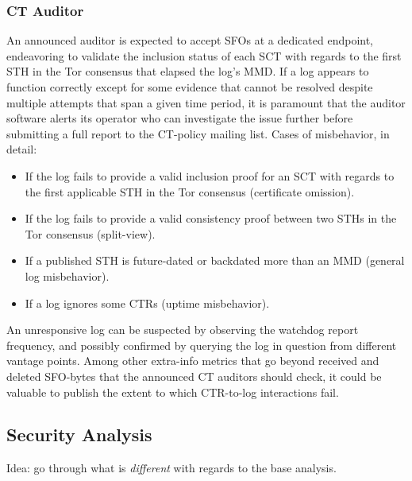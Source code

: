 \subsubsection{CT Auditor} \label{sec:auditor:auditor}
An announced auditor is expected to accept SFOs at a dedicated endpoint,
endeavoring to validate the inclusion status of each SCT with regards to the
first STH in the Tor consensus that elapsed the log's MMD.  If a log appears to
function correctly except for some evidence that cannot be
resolved despite multiple attempts that span a given time period, it is
paramount that the auditor software alerts its operator who can investigate
the issue further before submitting a full report to the CT-policy mailing list.
Cases of misbehavior, in detail:
\begin{itemize}
	\item If the log fails to provide a valid inclusion proof for an SCT with
		regards to the first applicable STH in the Tor consensus
		(certificate omission).
	\item If the log fails to provide a valid consistency proof between two
		STHs in the Tor consensus
		(split-view).
	\item If a published STH is future-dated or backdated more than an MMD
		(general log misbehavior).
	\item If a log ignores some CTRs (uptime misbehavior).
\end{itemize}

An unresponsive log can be suspected by observing the watchdog report frequency,
and possibly confirmed by querying the log in question from different vantage
points.  Among other extra-info metrics that go beyond received and deleted
SFO-bytes that the announced CT auditors should check, it could be valuable to
publish the extent to which CTR-to-log interactions fail.


\subsection{Security Analysis} \label{sec:auditor:analysis}
Idea: go through what is \emph{different} with regards to the base analysis.

